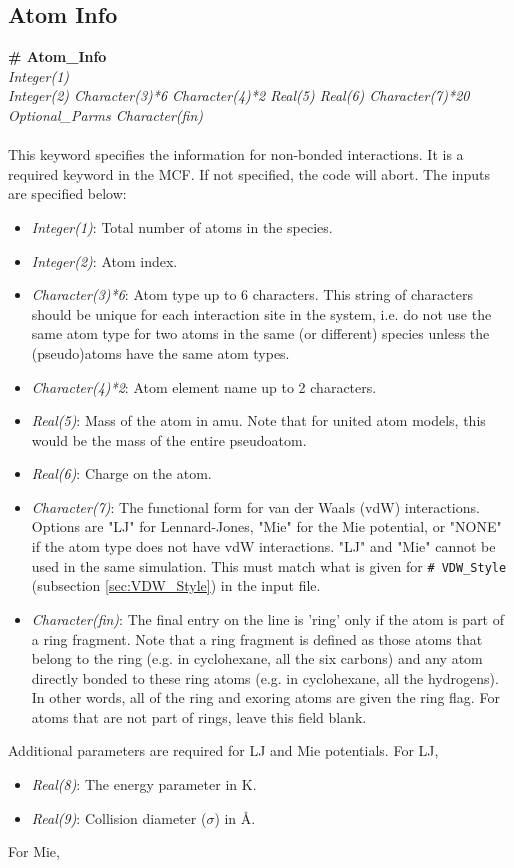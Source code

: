 \subsection{Atom Info}\label{sec:Get_Atom_Info}
%
{\bf \# Atom\_Info} \\
{\it Integer(1)} \\
{\it Integer(2)   Character(3)*6  Character(4)*2   Real(5)   Real(6)
  Character(7)*20     Optional\_Parms  Character(fin)} \\ \\
%
This keyword specifies the information for non-bonded interactions. 
It is a required keyword in the MCF. If not specified, the code will abort. The inputs are specified below: 
%
\begin{itemize} 
%
\item {\it Integer(1)}: Total number of atoms in the species. 
%
\item {\it Integer(2)}: Atom index. 
%
\item {\it Character(3)*6}: Atom type up to 6 characters. This string of characters should be
unique for each interaction site in the system, i.e. do not use the same atom type
for two atoms in the same (or different) species unless the (pseudo)atoms have the same atom types. 
%
\item {\it Character(4)*2}: Atom element name up to 2 characters. 
%
\item {\it Real(5)}: Mass of the atom in amu. Note that for united atom models, this would be the
mass of the entire pseudoatom. 
%
\item {\it Real(6)}: Charge on the atom.
%
\item {\it Character(7)}: The functional form for van der Waals (vdW) interactions.
Options are "LJ" for Lennard-Jones, "Mie" for the Mie potential, 
or "NONE" if the atom type does not have vdW interactions.
"LJ" and "Mie" cannot be used in the same simulation.
This must match what is given for \texttt{\# VDW\_Style}  
(subsection \ref{sec:VDW_Style}) in the input file.  

\item {\it Character(fin)}: The final entry on the line is 'ring' only if the atom is part 
of a ring fragment. 
Note that a ring fragment is defined as 
those atoms that belong to the ring (e.g. in cyclohexane, all the six carbons) 
and any atom directly bonded to these ring atoms (e.g. in cyclohexane, all the hydrogens).  
In other words, all of the ring and exoring atoms are given the ring flag. 
For atoms that are not part of rings, leave this field blank. 
\end{itemize} 
Additional parameters are required for LJ and Mie potentials. For LJ,
%
\begin{itemize} 
\item {\it Real(8)}: The energy parameter in K.
%
\item {\it Real(9)}: Collision diameter ($\sigma$)  in \AA.
\end{itemize} 
%
For Mie,

